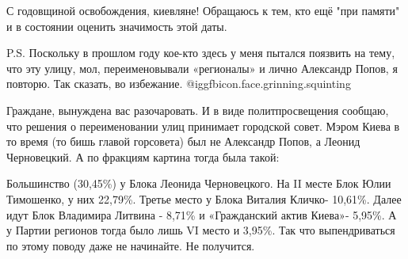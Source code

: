 С годовщиной освобождения, киевляне! Обращаюсь к тем, кто ещё "при памяти" и в
состоянии оценить значимость этой даты.

P.S. Поскольку в прошлом году кое-кто здесь у меня пытался поязвить на тему,
что эту улицу, мол, переименовывали «регионалы» и лично Александр Попов, я
повторю. Так сказать, во избежание.   @igg{fbicon.face.grinning.squinting}  

Граждане, вынуждена вас разочаровать. И в виде политпросвещения сообщаю, что
решения о переименовании улиц принимает городской совет. Мэром Киева в то время
(то бишь главой горсовета) был не Александр Попов, а Леонид Черновецкий. А по
фракциям картина тогда была такой: 

Большинство (30,45\%) у Блока Леонида Черновецкого. На II месте Блок Юлии
Тимошенко, у них 22,79\%. Третье место у Блока Виталия Кличко- 10,61\%. Далее
идут Блок Владимира Литвина - 8,71\% и «Гражданский актив Киева»- 5,95\%. А у
Партии регионов тогда было лишь VI место и 3,95\%. Так что выпендриваться по
этому поводу даже не начинайте. Не получится.

